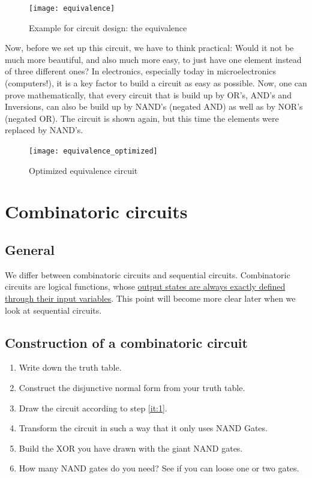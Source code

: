 \begin{figure}[H]
\centering
  \texttt{[image: equivalence]}%
  \caption{Example for circuit design: the equivalence}%
  \label{fig:equivalence}
\end{figure}

\noindent
Now, before we set up this circuit, we have to think practical: Would it not be much more beautiful, and also much more easy, to just have one element instead of three different ones? In electronics, especially today in microelectronics (computers!), it is a key factor to build a circuit as easy as possible. Now, one can prove mathematically, that every circuit that is build up by OR's, AND's and Inversions, can also be build up by NAND's (negated AND) as well as by NOR's (negated OR). The circuit is shown again, but this time the elements were replaced by NAND's. 

\begin{figure}[H]
\centering
  \texttt{[image: equivalence\_optimized]}%
  \caption{Optimized equivalence circuit}%
  \label{fig:equivalence_optimized}
\end{figure}

\section{Combinatoric circuits}
\subsection{General}
We differ between combinatoric circuits and sequential circuits. Combinatoric circuits are logical functions, whose \underline{output states are always exactly defined through their input variables}. This point will become more clear later when we look at sequential circuits. 

\subsection{Construction of a combinatoric circuit}
\begin{enumerate}
	\item Write down the truth table.
	\item\label{it:1} Construct the disjunctive normal form from your truth table.
	\item Draw the circuit according to step \ref{it:1}.
	\item Transform the circuit in such a way that it only uses NAND Gates.
	\item Build the XOR you have drawn with the giant NAND gates.
	\item How many NAND gates do you need? See if you can loose one or two gates.
\end{enumerate}



